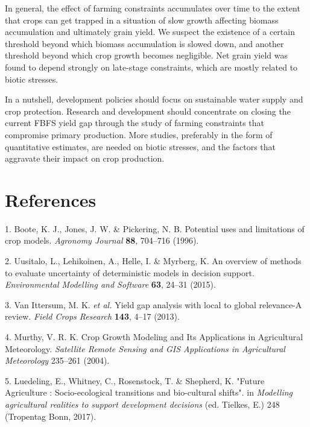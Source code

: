\documentclass[]{elsarticle} %
\begin{document}
In general, the effect of farming constraints accumulates over time to the extent that crops can get trapped in a situation of slow growth affecting biomass accumulation and ultimately grain yield. We suspect the existence of a certain threshold beyond which biomass accumulation is slowed down, and another threshold beyond which crop growth becomes negligible. Net grain yield was found to depend strongly on late-stage constraints, which are mostly related to biotic stresses.

In a nutshell, development policies should focus on sustainable water supply and crop protection. Research and development should concentrate on closing the current FBFS yield gap through the study of farming constraints that compromise primary production. More studies, preferably in the form of quantitative estimates, are needed on biotic stresses, and the factors that aggravate their impact on crop production.

\hypertarget{references}{%
\section*{References}\label{references}}

\hypertarget{refs}{}
\leavevmode\hypertarget{ref-Boote_et_al_1996}{}%
1. Boote, K. J., Jones, J. W. \& Pickering, N. B. Potential uses and limitations of crop models. \emph{Agronomy Journal} \textbf{88}, 704--716 (1996).

\leavevmode\hypertarget{ref-Uusitalo_et_al_2015}{}%
2. Uusitalo, L., Lehikoinen, A., Helle, I. \& Myrberg, K. An overview of methods to evaluate uncertainty of deterministic models in decision support. \emph{Environmental Modelling and Software} \textbf{63}, 24--31 (2015).

\leavevmode\hypertarget{ref-VanIttersum_et_al_2013}{}%
3. Van Ittersum, M. K. \emph{et al.} Yield gap analysis with local to global relevance-A review. \emph{Field Crops Research} \textbf{143}, 4--17 (2013).

\leavevmode\hypertarget{ref-Murthy_2004}{}%
4. Murthy, V. R. K. Crop Growth Modeling and Its Applications in Agricultural Meteorology. \emph{Satellite Remote Sensing and GIS Applications in Agricultural Meteorology} 235--261 (2004).

\leavevmode\hypertarget{ref-Luedeling_et_al_2017}{}%
5. Luedeling, E., Whitney, C., Rosenstock, T. \& Shepherd, K. "Future Agriculture : Socio-ecological transitions and bio-cultural shifts". in \emph{Modelling agricultural realities to support development decisions} (ed. Tielkes, E.) 248 (Tropentag Bonn, 2017).
\end{document}
